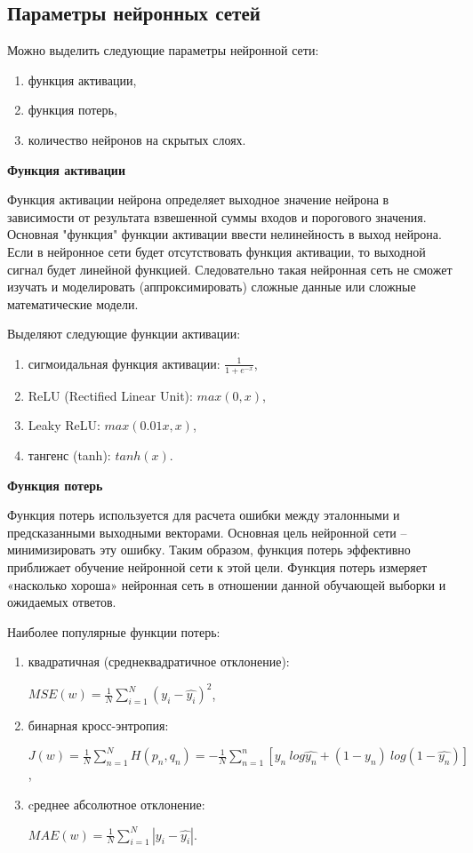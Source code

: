 \subsection{Параметры нейронных сетей}
\bigskip
Можно выделить следующие параметры нейронной сети:
\begin{enumerate}
	\item функция активации,
	\item функция потерь,
	\item количество нейронов на скрытых слоях.
\end{enumerate}
\bigskip
\noindent \textbf{Функция активации}

\bigskip
Функция активации нейрона определяет выходное значение нейрона в зависимости от результата взвешенной суммы входов и порогового значения.
Основная "функция" функции активации ввести нелинейность в выход нейрона. Если в нейронное сети будет отсутствовать функция активации, то выходной сигнал будет линейной функцией. Следовательно такая нейронная сеть не сможет изучать и моделировать (аппроксимировать) сложные данные или сложные математические модели.
\bigskip

Выделяют следующие функции активации:
\begin{enumerate}
	\item сигмоидальная функция активации: $\frac{1}{1+e^{-x}}$,
	
	\item ReLU (Rectified Linear Unit): $max(0, x)$,
	
	\item Leaky ReLU: $max(0.01x, x)$,
	
	\item тангенс (tanh): $tanh(x)$.
\end{enumerate}

\bigskip
\noindent \textbf{Функция потерь}

\bigskip
Функция потерь используется для расчета ошибки между эталонными и предсказанными выходными векторами. Основная цель нейронной сети – минимизировать эту ошибку. Таким образом, функция потерь эффективно приближает обучение нейронной сети к этой цели. Функция потерь измеряет «насколько хороша» нейронная сеть в отношении данной обучающей выборки и ожидаемых ответов.
\bigskip

Наиболее популярные функции потерь:
\begin{enumerate}
	\item квадратичная (среднеквадратичное отклонение):
	
	$MSE(w) = \frac{1}{N}\sum_{i=1}^{N} (y_i - \hat{y_i})^2$,
	\item бинарная кросс-энтропия: 
	
	$J(w) = \frac{1}{N}\sum_{n=1}^{N}H(p_n, q_n) = - \frac{1}{N}\sum_{n=1}^{n}[y_n\ log\hat{y_n} + (1 - y_n)\ log(1-\hat{y_n})]$,
	\item cреднее абсолютное отклонение:
	
	$MAE(w) = \frac{1}{N}\sum_{i=1}^{N} |y_i - \hat{y_i}|$.
\end{enumerate}

